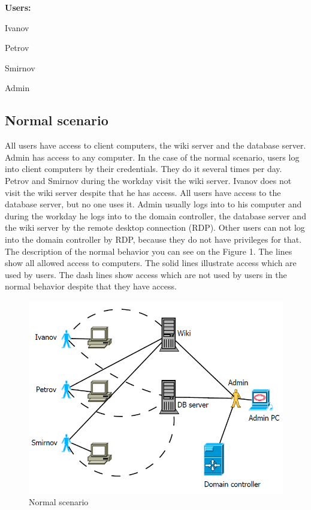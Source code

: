\begin{compactitem}
\item [\textbf{Users:}]
\item Ivanov
\item Petrov
\item Smirnov
\item Admin
\end{compactitem}
     
\subsection{Normal scenario}
All users have access to client computers, the wiki server and the database server. Admin has access to any computer. In the case of the normal scenario, users log into client computers by their credentials. They do it several times per day. Petrov and Smirnov during the workday visit the wiki server. Ivanov does not visit the wiki server despite that he has access. All users have access to the database server, but no one uses it. Admin usually logs into to his computer and during the workday he logs into to the domain controller, the database server and the wiki server by the remote desktop connection (RDP). Other users can not log into the domain controller by RDP, because they do not have privileges for that. The description of the normal behavior you can see on the Figure 1. The lines show all allowed access to computers. The solid lines illustrate access which are used by users. The dash lines show access which are not used by users in the normal behavior despite that they have access. 
\begin{figure}[ht!]
\centering
\includegraphics[width=\textwidth]{scenario_normal.png}
\caption{Normal scenario}
\label{overflow}
\end{figure}

